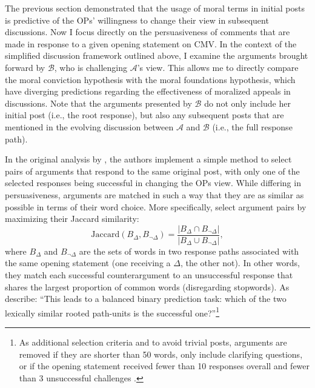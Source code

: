 
The previous section demonstrated that the usage of moral terms in initial posts is predictive of the OPs' willingness to change their view in subsequent discussions. Now I focus directly on the persuasiveness of comments that are made in response to a given opening statement on CMV. In the context of the simplified discussion framework outlined above, I examine the arguments brought forward by $\mathcal{B}$, who is challenging $\mathcal{A}$'s view. This allows me to directly compare the moral conviction hypothesis with the moral foundations hypothesis, which have diverging predictions regarding the effectiveness of moralized appeals in discussions. Note that the arguments presented by $\mathcal{B}$ do not only include her initial post (i.e., the root response), but also any subsequent posts that are mentioned in the evolving discussion between $\mathcal{A}$ and $\mathcal{B}$ (i.e., the full response path).

In the original analysis by \citet{tan2016winning}, the authors implement a simple method to select pairs of arguments that respond to the same original post, with only one of the selected responses being successful in changing the OPs view. While differing in persuasiveness, arguments are matched in such a way that they are as similar as possible in terms of their word choice. More specifically, \citet{tan2016winning} select argument pairs by maximizing their Jaccard similarity:
\begin{equation}
\text{Jaccard}(B_\Delta,B_{\neg\Delta})=\dfrac{|B_\Delta\cap B_{\neg\Delta}|}{|B_\Delta\cup B_{\neg\Delta}|},
\end{equation}
where $B_\Delta$ and $B_{\neg\Delta}$ are the sets of words in two response paths associated with the same opening statement (one receiving a $\Delta$, the other not). In other words, they match each successful counterargument to an unsuccessful response that shares the largest proportion of common words (disregarding stopwords). As \citet[617]{tan2016winning} describe: ``This leads to a balanced binary prediction task: which of the two lexically similar rooted path-units is the successful one?''\footnote{As additional selection criteria and to avoid trivial posts, arguments are removed if they are shorter than 50 words, only include clarifying questions, or if the opening statement received fewer than 10 responses overall and fewer than 3 unsuccessful challenges \citep[see][617 for details]{tan2016winning}.}

